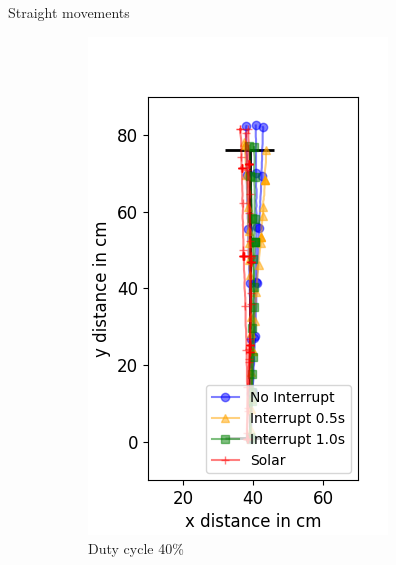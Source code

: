 \documentclass{beamer}
\begin{document}
\begin{frame}{Straight movements}
	\begin{figure}
		\centering
		\begin{subfigure}[b]{0.28\textwidth}
			\includegraphics[width=\textwidth]{pics/straight_40.png}
			\caption*{Duty cycle 40\%}
		\end{subfigure}
		\hspace{2em}
		\begin{subfigure}[b]{0.28\textwidth}

\end{subfigure}
\end{figure}
\end{frame}
\end{document}
